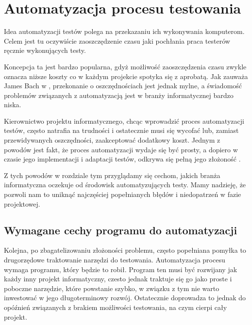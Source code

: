 \documentclass[00-praca-magisterska.tex]{subfiles}
\begin{document}
\chapter{Automatyzacja procesu testowania}
\label{automatyzacja}

Idea automatyzacji testów polega na przekazaniu ich wykonywania komputerom.
Celem jest tu oczywiście zaoszczędzenie czasu jaki pochłania praca testerów
ręcznie wykonujących testy.

Koncepcja ta jest bardzo popularna, gdyż możliwość zaoszczędzenia czasu zwykle
oznacza niższe koszty co w każdym projekcie spotyka się z aprobatą. Jak zauważa
James Bach w \cite{snake-oil}, przekonanie o oszczędnościach jest jednak mylne,
a świadomość problemów związanych z automatyzacją jest w branży informatycznej
bardzo niska.

Kierownictwo projektu informatycznego, chcąc wprowadzić proces automatyzacji
testów, często natrafia na trudności i ostatecznie musi się wycofać lub,
zamiast przewidywanych oszczędności, zaakceptować dodatkowy koszt. Jednym z
powodów jest fakt, że proces automatyzacji wydaje się być prosty, a dopiero w
czasie jego implementacji i adaptacji testów, odkrywa się pełną jego złożoność
\cite{automation-fail}.

Z tych powodów w rozdziale tym przyglądamy się cechom, jakich branża
informatyczna oczekuje od środowisk automatyzujących testy. Mamy nadzieję, że
pozwoli nam to uniknąć najczęściej popełnianych błędów i niedopatrzeń w fazie
projektowej.

\section{Wymagane cechy programu do automatyzacji}
\label{cechy-programu-do-automatyzacji}

Kolejna, po zbagatelizowaniu złożoności problemu, często popełniana pomyłka to
drugorzędowe traktowanie narzędzi do testowania. Automatyzacja procesu wymaga
programu, który będzie to robił.  Program ten musi być rozwijany jak każdy inny
projekt informatyczny, czesto jednak traktuje się go jako proste i poboczne
narzędzie, które powstanie szybko, w związku z tym nie warto inwestować w jego
długoterminowy rozwój.  Ostatecznie doprowadza to jednak do opóźnień związanych
z brakiem możliwości testowania, na czym cierpi cały projekt.  
\end{document}

